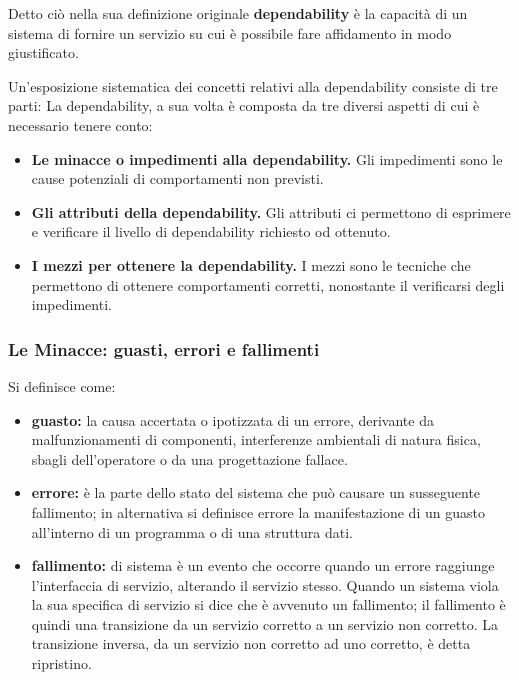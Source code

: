 \documentclass[14pt]{extarticle}
\begin{document}
Detto ciò nella sua definizione originale \textbf{dependability} è
la capacità di un sistema di fornire un servizio su cui è possibile fare affidamento in
modo giustificato.\cite{bondavalli2011analisi}

Un’esposizione sistematica dei concetti relativi alla dependability consiste di tre parti:
La dependability, a sua volta è  composta da tre diversi aspetti di cui è necessario tenere conto:
\begin{itemize}
\item \textbf{Le minacce o impedimenti alla dependability.} Gli impedimenti sono le
cause potenziali di comportamenti non previsti.
\item \textbf{Gli attributi della dependability.} Gli attributi ci permettono di esprimere
e verificare il livello di dependability richiesto od ottenuto.
\item \textbf{I mezzi per ottenere la dependability.} I mezzi sono le tecniche che
permettono di ottenere comportamenti corretti, nonostante il verificarsi
degli impedimenti.
\end{itemize}

\subsubsection{Le Minacce: guasti, errori e fallimenti}
Si definisce come:\cite{bondavalli2011analisi}
\begin{itemize}
\item \textbf{guasto:} la causa accertata o ipotizzata di un errore, derivante da malfunzionamenti di componenti, interferenze ambientali di natura fisica, sbagli dell’operatore o da una progettazione fallace.
\item \textbf{errore:} è la parte dello stato del sistema che può causare un susseguente fallimento; in alternativa si definisce errore la manifestazione di un guasto all’interno di un programma o di una struttura dati.
\item \textbf{fallimento:} di sistema è un evento che occorre quando un errore raggiunge l’interfaccia di servizio, alterando il servizio stesso. Quando un sistema viola la sua specifica di servizio si dice che è avvenuto un fallimento; il fallimento è quindi una transizione da un servizio corretto a un servizio non corretto. La transizione inversa, da un servizio non corretto ad uno corretto, è detta ripristino.
\end{itemize}
\end{document}
